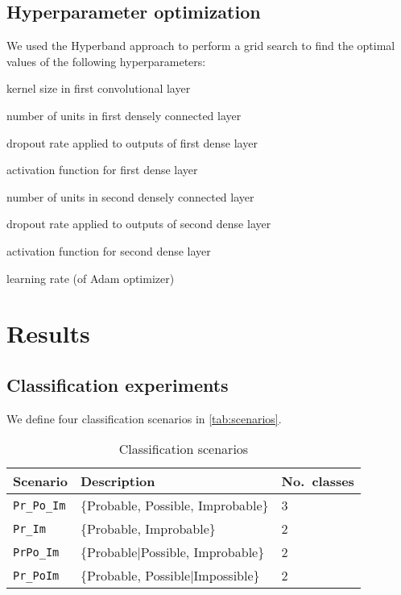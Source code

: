\documentclass[Journal, letterpaper]{ascelike-new}
\newcommand{\?}{\stackrel{?}{=}}
\begin{document}
\subsection{Hyperparameter optimization}
We used the Hyperband approach \cite{li2018hyperband} to perform a grid search to find the optimal values of the following hyperparameters:
\begin{compactitem}
    \item kernel size in first convolutional layer
    \item number of units in first densely connected layer
    \item dropout rate applied to outputs of first dense layer
    \item activation function for first dense layer
    \item number of units in second densely connected layer
    \item dropout rate applied to outputs of second dense layer
    \item activation function for second dense layer    
    \item learning rate (of Adam optimizer)
\end{compactitem}

\section{Results}

\subsection{Classification experiments}

We define four classification scenarios in \autoref{tab:scenarios}. 

\begin{table}[h!]
    \centering
    \begin{tabular}{l l l}\toprule
    \bf Scenario            & \bf Description  & \bf No.\ classes\\\midrule
    \texttt{Pr\_Po\_Im}     &  \{Probable, Possible, Improbable\} & 3 \\
    \texttt{Pr\_Im}          & \{Probable, Improbable\}           & 2 \\
    \texttt{PrPo\_Im}        & \{Probable|Possible, Improbable\}  & 2 \\
    \texttt{Pr\_PoIm}        & \{Probable, Possible|Impossible\}  & 2 \\\bottomrule
    \end{tabular}
    \caption{Classification scenarios}
    \label{tab:scenarios}
\end{table}
\end{document}

